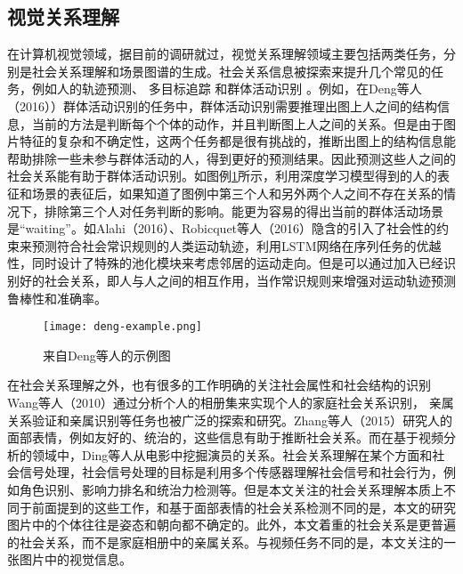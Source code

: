\subsection{视觉关系理解}
在计算机视觉领域，据目前的调研就过，视觉关系理解领域主要包括两类任务，分别是社会关系理解和场景图谱的生成。社会关系信息被探索来提升几个常见的任务，例如人的轨迹预测\cite{kim2015brvo,robicquet2016learning}、 多目标追踪\cite{chen2012discovering,qin2012improving} 和群体活动识别
\cite{direkoglu2012team,lan2012social,lan2012discriminative}。例如，在Deng等人（2016）\cite{deng2016structure}）群体活动识别的任务中，群体活动识别需要推理出图上人之间的结构信息，当前的方法是判断每个个体的动作，并且判断图上人之间的关系。但是由于图片特征的复杂和不确定性，这两个任务都是很有挑战的，推断出图上的结构信息能帮助排除一些未参与群体活动的人，得到更好的预测结果。因此预测这些人之间的社会关系能有助于群体活动识别。如图例\ref{fig:deng-example}所示，利用深度学习模型得到的人的表征和场景的表征后，如果知道了图例中第三个人和另外两个人之间不存在关系的情况下，排除第三个人对任务判断的影响。能更为容易的得出当前的群体活动场景是``waiting''。如Alahi（2016）\cite{alahi2016social}、Robicquet等人（2016）\cite{robicquet2016learning}隐含的引入了社会性的约束来预测符合社会常识规则的人类运动轨迹，利用LSTM网络在序列任务的优越性，同时设计了特殊的池化模块来考虑邻居的运动走向。但是可以通过加入已经识别好的社会关系，即人与人之间的相互作用，当作常识规则来增强对运动轨迹预测鲁棒性和准确率。
\begin{figure}[htpb]
	\centering
	\texttt{[image: deng-example.png]}
    \caption{来自Deng等人\cite{deng2016structure}的示例图}
	\vspace*{-3.5mm}
	\label{fig:deng-example}
\end{figure}

在社会关系理解之外，也有很多的工作明确的关注社会属性和社会结构的识别Wang等人（2010）\cite{wang2010seeing}通过分析个人的相册集来实现个人的家庭社会关系识别，
亲属关系验证\cite{dibeklioglu2013like,fang2010towards,xia2012understanding}和亲属识别\cite{chen2012discovering,guo2014graph}等任务也被广泛的探索和研究。Zhang等人（2015）\cite{zhang2015learning}研究人的面部表情，例如友好的、统治的，这些信息有助于推断社会关系。而在基于视频分析的领域中，Ding等人\cite{ding2014learning}从电影中挖掘演员的关系。社会关系理解在某个方面和社会信号处理\cite{vinciarelli2009social}，社会信号处理的目标是利用多个传感器理解社会信号和社会行为，例如角色识别、影响力排名和统治力检测等\cite{hung2007using,rienks2006detection,salamin2009automatic}。但是本文关注的社会关系理解本质上不同于前面提到的这些工作，和基于面部表情的社会关系检测不同的是，本文的研究图片中的个体往往是姿态和朝向都不确定的。此外，本文着重的社会关系是更普遍的社会关系，而不是家庭相册中的亲属关系。与视频任务不同的是，本文关注的一张图片中的视觉信息。

